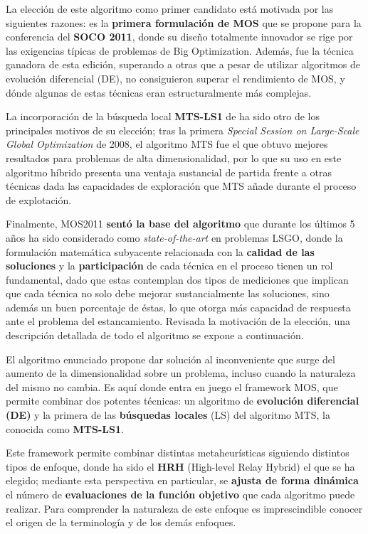 La elección de este algoritmo como primer candidato está motivada por las siguientes razones: es la \textbf{primera formulación de MOS} que se propone para la conferencia del \textbf{SOCO 2011}, donde su diseño totalmente innovador se rige por las exigencias típicas de problemas de Big Optimization. Además, fue la técnica ganadora de esta edición, superando a otras que a pesar de utilizar algoritmos de evolución diferencial (DE), no consiguieron superar el rendimiento de MOS, y dónde algunas de estas técnicas eran estructuralmente más complejas.

La incorporación de la búsqueda local \textbf{MTS-LS1} de \cite{MTS-LSGO} ha sido otro de los principales motivos de su elección; tras la primera \textit{Special Session on Large-Scale Global Optimization} de 2008, el algoritmo MTS fue el que obtuvo mejores resultados para problemas de alta dimensionalidad, por lo que su uso en este algoritmo híbrido presenta una ventaja sustancial de partida frente a otras técnicas dada las capacidades de exploración que MTS añade durante el proceso de explotación.

Finalmente, MOS2011 \textbf{sentó la base del algoritmo} que durante los últimos 5 años ha sido considerado como \textit{state-of-the-art} en problemas LSGO, donde la formulación matemática subyacente relacionada con la \textbf{calidad de las soluciones} y la \textbf{participación} de cada técnica en el proceso tienen un rol fundamental, dado que estas contemplan dos tipos de mediciones que implican que cada técnica no solo debe mejorar sustancialmente las soluciones, sino además un buen porcentaje de éstas, lo que otorga más capacidad de respuesta ante el problema del estancamiento. Revisada la motivación de la elección, una descripción detallada de todo el algoritmo se expone a continuación.

El algoritmo enunciado propone dar solución al inconveniente que surge del aumento de la dimensionalidad sobre un problema, incluso cuando la naturaleza del mismo no cambia. Es aquí donde entra en juego el framework MOS, que permite combinar dos potentes técnicas: un algoritmo de \textbf{evolución diferencial (DE)} y la primera de las \textbf{búsquedas locales} (LS) del algoritmo MTS, la conocida como \textbf{MTS-LS1}\cite{MTS-LSGO}.

Este framework permite combinar distintas metaheurísticas siguiendo distintos tipos de enfoque, donde ha sido el \textbf{HRH} (High-level Relay Hybrid) el que se ha elegido; mediante esta perspectiva en particular, se \textbf{ajusta de forma dinámica} el número de \textbf{evaluaciones de la función objetivo} que cada algoritmo puede realizar. Para comprender la naturaleza de este enfoque es imprescindible conocer el origen de la terminología y de los demás enfoques.

